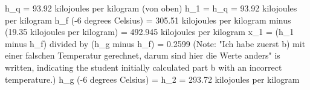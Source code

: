 h_q = 93.92 kilojoules per kilogram (von oben)  
h_1 = h_q = 93.92 kilojoules per kilogram  
h_f (-6 degrees Celsius) = 305.51 kilojoules per kilogram minus (19.35 kilojoules per kilogram) = 492.945 kilojoules per kilogram  
x_1 = (h_1 minus h_f) divided by (h_g minus h_f) = 0.2599  
(Note: "Ich habe zuerst b) mit einer falschen Temperatur gerechnet, darum sind hier die Werte anders" is written, indicating the student initially calculated part b with an incorrect temperature.)  
h_g (-6 degrees Celsius) = h_2 = 293.72 kilojoules per kilogram